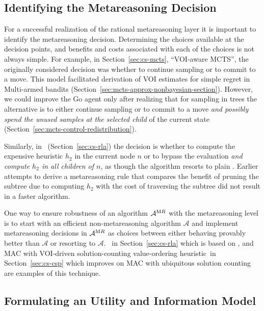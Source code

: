 \subsection{Identifying the Metareasoning Decision}

For a successful realization of the rational metareasoning layer it is
important to identify the metareasoning decision. Determining the
choices available at the decision points, and benefits and costs
associated with each of the choices is not always simple. For example,
in Section~\ref{sec:cs-mcts}, ``VOI-aware MCTS'', the originally
considered decision was whether to continue sampling or to commit to a
move. This model facilitated derivation of VOI estimates for simple
regret in Multi-armed bandits
(Section~\ref{sec:mcts-approx-nonbayesian-section}). However, we could
improve the Go agent only after realizing that for sampling in trees
the alternative is to either continue sampling or to commit to a move
\emph{and possibly spend the unused samples at the selected child} of
the current state (Section~\ref{sec:mcts-control-redistribution}).

Similarly, in \rationallazyastar~(Section~\ref{sec:cs-rla}) the
decision is whether to compute the expensive heuristic $h_2$ in the current
node $n$ or to bypass the evaluation \emph{and compute $h_2$ in all
  children of $n$}, as though the algorithm resorts to plain \lazyastar.
Earlier attempts to derive a metareasoning rule that compares the
benefit of pruning the subtree due to computing $h_2$ 
with the cost of traversing the subtree did not result in a faster
algorithm. 

One way to ensure robustness of an algorithm ${\mathcal A}^{\textrm MR}$ with the
metareasoning level is to start with an efficient non-metareasoning
algorithm ${\mathcal A}$ and implement metareasoning decisions in ${\mathcal
A}^{\textrm MR}$ as choices
between either behaving provably better than ${\mathcal A}$ or
resorting to ${\mathcal A}$.
\rationallazyastar~in Section~\ref{sec:cs-rla} which is based on
\lazyastar, and MAC with VOI-driven solution-counting value-ordering
heuristic~in Section~\ref{sec:cs-csp} which improves on MAC with
ubiquitous solution counting are examples of this technique.

\subsection{Formulating an Utility and Information Model}

